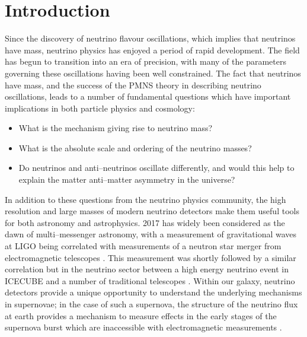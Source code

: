 \chapter{\label{ch:1-intro}Introduction} 


Since the discovery of neutrino flavour oscillations, which implies that
neutrinos have mass, neutrino physics has enjoyed a period of rapid development.
The field has begun to transition into an era of precision, with many of the
parameters governing these oscillations having been well constrained. The fact
that neutrinos have mass, and the success of the PMNS theory in describing
neutrino oscillations, leads to a number of fundamental questions which have
important implications in both particle physics and cosmology: 

\begin{itemize}
	\item What is the mechanism giving rise to neutrino mass? 
	\item What is the absolute scale and ordering of the neutrino masses?
	\item Do neutrinos and anti--neutrinos oscillate differently, and would this 
	      help to explain the matter anti--matter asymmetry in the universe?
\end{itemize}

In addition to these questions from the neutrino physics community, the high
resolution and large masses of modern neutrino detectors make them useful tools
for both astronomy and astrophysics. 2017 has widely been considered as the dawn
of multi--messenger astronomy, with a measurement of gravitational waves at LIGO
being correlated with measurements of a neutron star merger from electromagnetic
telescopes \cite{Abbott2017}. This measurement was shortly followed by a similar
correlation but in the neutrino sector between a high energy neutrino event in
ICECUBE and a number of traditional telescopes \cite{Aartsen2018}. Within our
galaxy, neutrino detectors provide a unique opportunity to understand the
underlying mechanisms in supernovae; in the case of such a supernova, the
structure of the neutrino flux at earth provides a mechanism to measure effects
in the early stages of the supernova burst which are inaccessible with
electromagnetic measurements \cite{Scholberg:2012id}.

